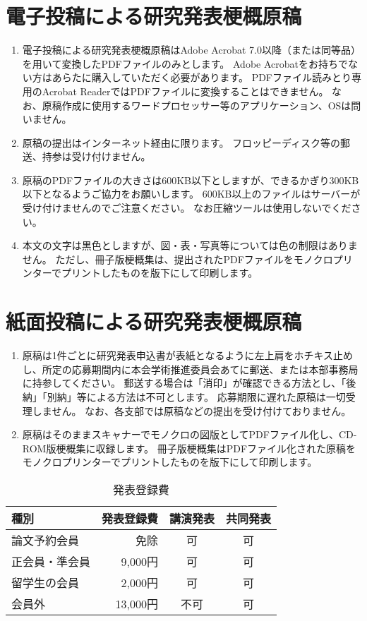\documentclass[base=10pt,magstyle=real,a4paper,twocolumn,xelatex,pandoc,jafont=ms]{bxjsarticle}
\begin{document}
\section{電子投稿による研究発表梗概原稿}
	\begin{enumerate}
		\item 電子投稿による研究発表梗概原稿はAdobe Acrobat 7.0以降（または同等品）を用いて変換したPDFファイルのみとします。
		Adobe Acrobatをお持ちでない方はあらたに購入していただく必要があります。
		PDFファイル読みとり専用のAcrobat ReaderではPDFファイルに変換することはできません。
		なお、原稿作成に使用するワードプロセッサー等のアプリケーション、OSは問いません。
		\item 原稿の提出はインターネット経由に限ります。
		フロッピーディスク等の郵送、持参は受け付けません。
		\item 原稿のPDFファイルの大きさは600KB以下としますが、できるかぎり300KB以下となるようご協力をお願いします。
		600KB以上のファイルはサーバーが受け付けませんのでご注意ください。
		なお圧縮ツールは使用しないでください。
		\item 本文の文字は黒色としますが、図・表・写真等については色の制限はありません。
		ただし、冊子版梗概集は、提出されたPDFファイルをモノクロプリンターでプリントしたものを版下にして印刷します。
	\end{enumerate}

\section{紙面投稿による研究発表梗概原稿}
	\begin{enumerate}
		\item 原稿は1件ごとに研究発表申込書が表紙となるように左上肩をホチキス止めし、所定の応募期間内に本会学術推進委員会あてに郵送、または本部事務局に持参してください。
		郵送する場合は「消印」が確認できる方法とし、「後納」「別納」等による方法は不可とします。
		応募期限に遅れた原稿は一切受理しません。
		なお、各支部では原稿などの提出を受け付けておりません。
		\item 原稿はそのままスキャナーでモノクロの図版としてPDFファイル化し、CD-ROM版梗概集に収録します。
		冊子版梗概集はPDFファイル化された原稿をモノクロプリンターでプリントしたものを版下にして印刷します。
	\end{enumerate}
\begin{table}
	\centering
	\caption{発表登録費}
	\begin{tabular}{lrcc}
		種別&発表登録費&講演発表&共同発表\\ \hline
		論文予約会員&免除&可&可\\ \hline
		正会員・準会員&9,000円&可&可\\ \hline
		留学生の会員&2,000円&可&可\\ \hline
		会員外&13,000円&不可&可
	\end{tabular}
\end{table}
\end{document}
